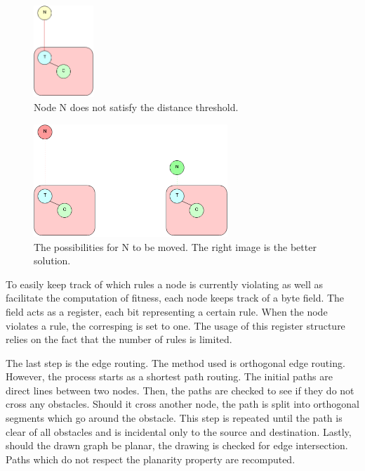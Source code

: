 \begin{figure}[ht] \centering
\includegraphics[width=0.2\textwidth]{img/algdesing/recombination.png}
\caption{Node N does not satisfy the distance threshold.} \end{figure}

\begin{figure}[ht] \centering
\includegraphics[width=0.65\textwidth]{img/algdesing/recombinationposib.png}
\caption{The possibilities for N to be moved. The right image is the better solution.} \end{figure}

To easily keep track of which rules a node is currently violating as well as facilitate the computation of fitness, each node keeps track of a byte field. 
The field acts as a register, each bit representing a certain rule. When the node violates a rule, the corresping is set to one. The usage of this register
structure relies on the fact that the number of rules is limited.

The last step is the edge routing. The method used is orthogonal edge routing. However, the process starts as a shortest path routing. The initial paths 
are direct lines between two nodes. Then, the paths are checked to see if they do not cross any obstacles. Should it cross another node, the path is split 
into orthogonal segments which go around the obstacle. This step is repeated until the path is clear of all obstacles and is incidental only to the source and 
destination. Lastly, should the drawn graph be planar, the drawing is checked for edge intersection. Paths which do not respect the planarity property 
are recomputed.

